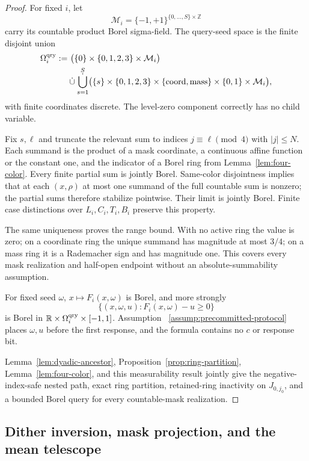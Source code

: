 \begin{proof}
For fixed $i$, let
\[
 \mathcal M_i=\{-1,+1\}^{\{0,\ldots,S\}\times\mathbb Z}
\]
carry its countable product Borel sigma-field.  The query-seed space is the
finite disjoint union
\[
\begin{aligned}
 \Omega_i^{\rm qry}
 :=&\ \bigl(\{0\}\times\{0,1,2,3\}\times\mathcal M_i\bigr)\\
 &\mathbin{\dot\cup}\mathop{\dot\bigcup}_{s=1}^S
 \bigl(\{s\}\times\{0,1,2,3\}
 \times\{{\rm coord},{\rm mass}\}\times\{0,1\}\times\mathcal M_i\bigr),
\end{aligned}
\]
with finite coordinates discrete.  The level-zero component correctly has no
child variable.

Fix $s,\ell$ and truncate the relevant sum to indices
$j\equiv\ell\pmod4$ with $|j|\leq N$.  Each summand is the product of a
mask coordinate, a continuous affine function or the constant one, and the
indicator of a Borel ring from Lemma~\ref{lem:four-color}.  Every finite
partial sum is jointly Borel.  Same-color disjointness implies that at each
$(x,\rho)$ at most one summand of the full countable sum is nonzero; the
partial sums therefore stabilize pointwise.  Their limit is jointly Borel.
Finite case distinctions over $L_i,C_i,T_i,B_i$ preserve this property.

The same uniqueness proves the range bound.  With no active ring the value is
zero; on a coordinate ring the unique summand has magnitude at most $3/4$;
on a mass ring it is a Rademacher sign and has magnitude one.  This covers
every mask realization and half-open endpoint without an absolute-summability
assumption.

For fixed seed $\omega$, $x\mapsto F_i(x,\omega)$ is Borel, and more
strongly
\[
 \{(x,\omega,u):F_i(x,\omega)-u\geq0\}
\]
is Borel in
$\mathbb R\times\Omega_i^{\rm qry}\times[-1,1]$.  Assumption~
\ref{assump:precommitted-protocol} places $\omega,u$ before the first response,
and the formula contains no $c$ or response bit.

Lemma~\ref{lem:dyadic-ancestor}, Proposition~\ref{prop:ring-partition},
Lemma~\ref{lem:four-color}, and this measurability result jointly give the
negative-index-safe nested path, exact ring partition, retained-ring
inactivity on $J_{0,j_0}$, and a bounded Borel query for every countable-mask
realization.
\end{proof}

\subsection{Dither inversion, mask projection, and the mean telescope}

